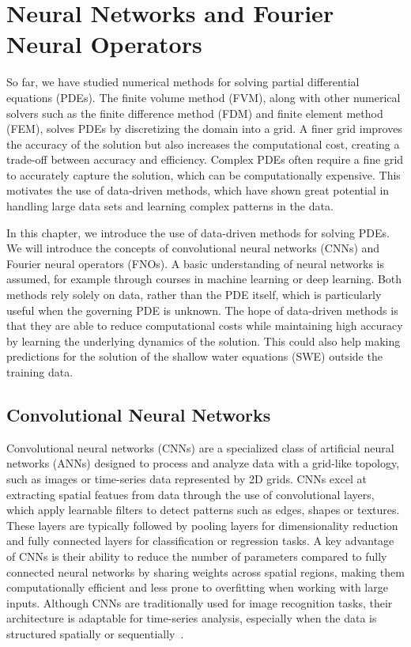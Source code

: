 \chapter{Neural Networks and Fourier Neural Operators}\label{ch:FNO+NN}
So far, we have studied numerical methods for solving partial differential equations (PDEs).
The finite volume method (FVM), along with other numerical solvers such as the finite difference method (FDM) and finite element method (FEM), solves PDEs by discretizing the domain into a grid.
A finer grid improves the accuracy of the solution but also increases the computational cost, creating a trade-off between accuracy and efficiency.
Complex PDEs often require a fine grid to accurately capture the solution, which can be computationally expensive.
This motivates the use of data-driven methods, which have shown great potential in handling large data sets and learning complex patterns in the data.

In this chapter, we introduce the use of data-driven methods for solving PDEs.
We will introduce the concepts of convolutional neural networks (CNNs) and Fourier neural operators (FNOs).
A basic understanding of neural networks is assumed, for example through courses in machine learning or deep learning.
Both methods rely solely on data, rather than the PDE itself, which is particularly useful when the governing PDE is unknown.
The hope of data-driven methods is that they are able to reduce computational costs while maintaining high accuracy by learning the underlying dynamics of the solution.
This could also help making predictions for the solution of the shallow water equations (SWE) outside the training data.


\section{Convolutional Neural Networks}\label{sec:CNN}
Convolutional neural networks (CNNs) are a specialized class of artificial neural networks (ANNs) designed to process and analyze data with a grid-like topology, such as images or time-series data represented by 2D grids.
CNNs excel at extracting spatial featues from data through the use of convolutional layers, which apply learnable filters to detect patterns such as edges, shapes or textures.
These layers are typically followed by pooling layers for dimensionality reduction and fully connected layers for classification or regression tasks.
A key advantage of CNNs is their ability to reduce the number of parameters compared to fully connected neural networks by sharing weights across spatial regions, making them computationally efficient and less prone to overfitting when working with large inputs.
Although CNNs are traditionally used for image recognition tasks, their architecture is adaptable for time-series analysis, especially when the data is structured spatially or sequentially~\cite{chollet2017comprehensive}.

